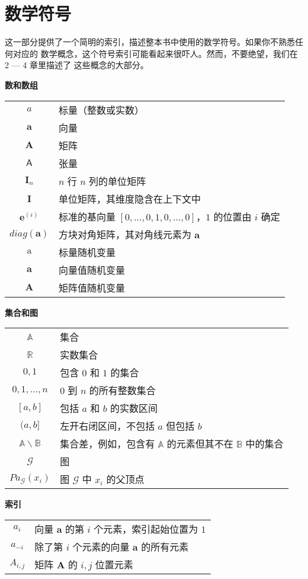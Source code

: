 \chapter{数学符号}
\label{ch:notation}

这一部分提供了一个简明的索引，描述整本书中使用的数学符号。如果你不熟悉任何对应的
数学概念，这个符号索引可能看起来很吓人。然而，不要绝望，我们在 2 --- 4 章里描述了
这些概念的大部分。

\begin{center}
{\Large\bfseries 数和数组}\\
\vspace{1em}
\begin{tabular}{c l}
  $a$ & 标量（整数或实数）\\
  $\pmb{a}$ & 向量 \\
  $\pmb{A}$ & 矩阵 \\
  $\mathsf{A}$ & 张量 \\
  $\pmb{I}_n$ & $n$ 行 $n$ 列的单位矩阵 \\
  $\pmb{I}$ & 单位矩阵，其维度隐含在上下文中 \\
  $\pmb{e}^{(i)}$ & 标准的基向量 $[0, \ldots, 0, 1, 0, \ldots, 0]$，$1$ 的位置由 $i$ 确定 \\
  $diag(\pmb{a})$ & 方块对角矩阵，其对角线元素为 $\pmb{a}$ \\
  $\mathrm{a}$ & 标量随机变量 \\
  $\mathbf{a}$ & 向量值随机变量 \\
  $\mathbf{A}$ & 矩阵值随机变量
\end{tabular}
\end{center}

\vspace{1em}

\begin{center}
{\Large\bfseries 集合和图}\\
\vspace{1em}
\begin{tabular}{c l}
  $\mathbb{A}$ & 集合 \\
  $\mathbb{R}$ & 实数集合 \\
  ${0,1}$ & 包含 $0$ 和 $1$ 的集合 \\
  ${0,1,\ldots,n}$ & $0$ 到 $n$ 的所有整数集合 \\
  $[a,b]$ & 包括 $a$ 和 $b$ 的实数区间 \\
  $(a,b]$ & 左开右闭区间，不包括 $a$ 但包括 $b$ \\
  $\mathbb{A}\backslash\mathbb{B}$ & 集合差，例如，包含有 $\mathbb{A}$ 的元素但其不在 $\mathbb{B}$ 中的集合 \\
  $\mathcal{G}$ & 图 \\
  $Pa_{\mathcal{G}}(x_i)$ & 图  $\mathcal{G}$ 中 $x_i$ 的父顶点
\end{tabular}
\end{center}

\vspace{1em}

\begin{center}
{\Large\bfseries 索引}\\
\vspace{1em}
\begin{tabular}{c l}
  $a_i$ & 向量 $\pmb{a}$ 的第 $i$ 个元素，索引起始位置为 $1$ \\
  $a_{-i}$ & 除了第 $i$ 个元素的向量 $\pmb{a}$ 的所有元素 \\
  $A_{i,j}$ & 矩阵 $\pmb{A}$ 的 $i,j$ 位置元素
\end{tabular}
\end{center}
